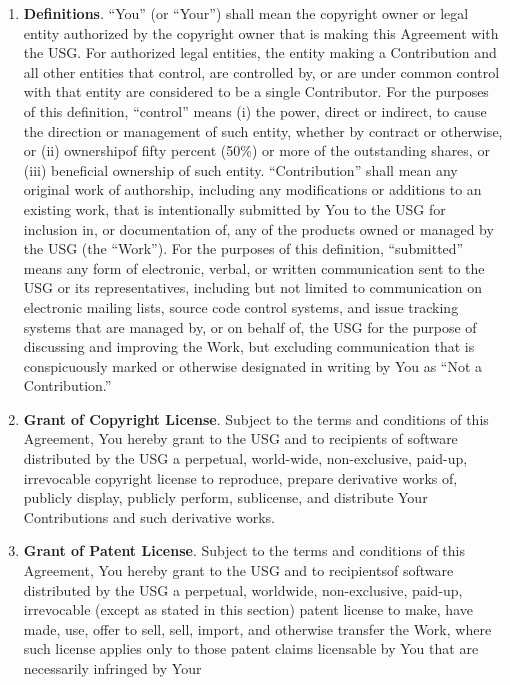 \begin{enumerate}
\def\labelenumi{\arabic{enumi}.}
\tightlist
\item
  \textbf{Definitions}. ``You'' (or ``Your'') shall mean the copyright
  owner or legal entity authorized by the copyright owner that is making
  this Agreement with the USG. For authorized legal entities, the entity
  making a Contribution and all other entities that control, are
  controlled by, or are under common control with that entity are
  considered to be a single Contributor. For the purposes of this
  definition, ``control'' means (i) the power, direct or indirect, to
  cause the direction or management of such entity, whether by contract
  or otherwise, or (ii) ownershipof fifty percent (50\%) or more of the
  outstanding shares, or (iii) beneficial ownership of such entity.
  ``Contribution'' shall mean any original work of authorship, including
  any modifications or additions to an existing work, that is
  intentionally submitted by You to the USG for inclusion in, or
  documentation of, any of the products owned or managed by the USG (the
  ``Work''). For the purposes of this definition, ``submitted'' means
  any form of electronic, verbal, or written communication sent to the
  USG or its representatives, including but not limited to communication
  on electronic mailing lists, source code control systems, and issue
  tracking systems that are managed by, or on behalf of, the USG for the
  purpose of discussing and improving the Work, but excluding
  communication that is conspicuously marked or otherwise designated in
  writing by You as ``Not a Contribution.''
\item
  \textbf{Grant of Copyright License}. Subject to the terms and
  conditions of this Agreement, You hereby grant to the USG and to
  recipients of software distributed by the USG a perpetual, world-wide,
  non-exclusive, paid-up, irrevocable copyright license to reproduce,
  prepare derivative works of, publicly display, publicly perform,
  sublicense, and distribute Your Contributions and such derivative
  works.
\item
  \textbf{Grant of Patent License}. Subject to the terms and conditions
  of this Agreement, You hereby grant to the USG and to recipientsof
  software distributed by the USG a perpetual, worldwide, non-exclusive,
  paid-up, irrevocable (except as stated in this section) patent license
  to make, have made, use, offer to sell, sell, import, and otherwise
  transfer the Work, where such license applies only to those patent
  claims licensable by You that are necessarily infringed by Your

\end{enumerate}
